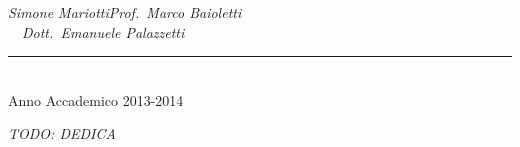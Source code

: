 \documentclass[a4paper,12pt]{report}
\def\laureando{Simone Mariotti}       %
\def\annoaccademico{2013-2014}    %
\def\dedica{TODO: DEDICA}      %
\newlength\corpo
\begin{document}
\begin{titlepage}
\hspace{0.0cm}\emph{\laureando}\hfill\emph{Prof.~Marco Baioletti}\\
\ \ \hspace*{3.0cm}\hfill\emph{Dott.~Emanuele Palazzetti}\\

\begin{center}

\rule{40mm}{0.01mm}\\

Anno Accademico \annoaccademico

\end{center}

\end{titlepage}

\newpage
\thispagestyle{empty}
\vspace*{2.5cm}
\begin{flushright}
\begin{Large}\emph{\dedica}\end{Large}
\end{flushright}
\frenchspacing
%

\thispagestyle{empty}
\tableofcontents



\fancyhf{}
\pagestyle{fancy}


\newpage
{}







%



\newpage

\end{document}
